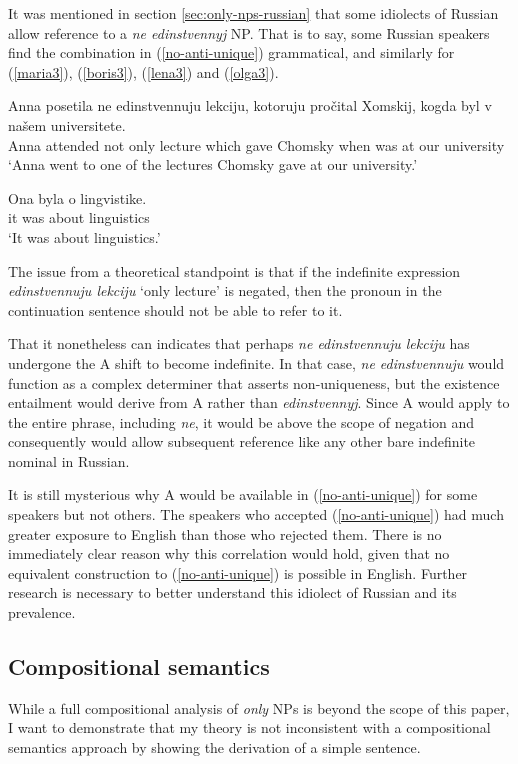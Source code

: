 It was mentioned in section \ref{sec:only-nps-russian} that some idiolects of Russian allow reference to a \textit{ne edinstvennyj} NP. That is to say, some Russian speakers find the combination in (\ref{no-anti-unique}) grammatical, and similarly for (\ref{maria3}), (\ref{boris3}), (\ref{lena3}) and (\ref{olga3}).

\begin{exe}
	\ex \label{no-anti-unique} \begin{xlist}
		\ex \gll Anna posetila ne edinstvennuju lekciju, kotoruju pro\v{c}ital Xomskij, kogda byl v na\v{s}em universitete.\\
		Anna attended not only lecture which gave Chomsky when was at our university\\
		\glt `Anna went to one of the lectures Chomsky gave at our university.'
		
		\ex \gll Ona byla o lingvistike.\\
		it was about linguistics\\
		\glt `It was about linguistics.'
	\end{xlist}
\end{exe}

The issue from a theoretical standpoint is that if the indefinite expression \textit{edinstvennuju lekciju} `only lecture' is negated, then the pronoun in the continuation sentence should not be able to refer to it.

That it nonetheless can indicates that perhaps \textit{ne edinstvennuju lekciju} has undergone the \textsc{A} shift to become indefinite. In that case, \textit{ne edinstvennuju} would function as a complex determiner that asserts non-uniqueness, but the existence entailment would derive from \textsc{A} rather than \textit{edinstvennyj}. Since \textsc{A} would apply to the entire phrase, including \textit{ne}, it would be above the scope of negation and consequently would allow subsequent reference like any other bare indefinite nominal in Russian.

It is still mysterious why \textsc{A} would be available in (\ref{no-anti-unique}) for some speakers but not others. The speakers who accepted (\ref{no-anti-unique}) had much greater exposure to English than those who rejected them. There is no immediately clear reason why this correlation would hold, given that no equivalent construction to (\ref{no-anti-unique}) is possible in English. Further research is necessary to better understand this idiolect of Russian and its prevalence.

\subsection{Compositional semantics}
While a full compositional analysis of \textit{only} NPs is beyond the scope of this paper, I want to demonstrate that my theory is not inconsistent with a compositional semantics approach by showing the derivation of a simple sentence.


